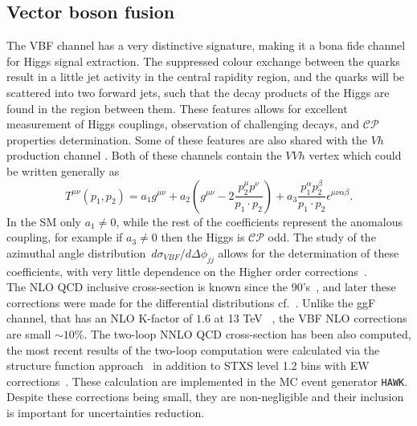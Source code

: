 \subsection{Vector boson fusion}
The VBF channel has a very distinctive signature, making it a bona fide channel for Higgs signal extraction. The suppressed colour exchange between the quarks result in a little jet activity in the central rapidity region, and the quarks will be scattered into two forward jets, such that the decay products of the Higgs are found in the region between them.  These features allows for excellent measurement of Higgs couplings, observation of challenging decays, and $\mathcal{CP}$ properties determination. Some of these features are also shared with the $Vh$ production channel . Both of these channels contain the $VVh$ vertex which could be written generally as~\cite{LHCHiggsCrossSectionWorkingGroup:2016ypw}
\begin{equation}
T^{\mu \nu}(p_1,p_2) = a_1 g^{\mu \nu}+ a_2  \left(g^{\mu \nu}- 2\frac{p^\mu_{2} p^\nu }{p_1 \cdot p_2} \right)  + a_3 \frac{p_1^\alpha p_2^ \beta}{p_1 \cdot p_2}\epsilon^{\mu \nu \alpha \beta}. 
\end{equation} 
In the SM only $a_1\neq0$, while the rest of the coefficients represent the anomalous coupling, for example if $a_3 \neq0$ then the Higgs is  $\mathcal{CP}$  odd. The study of the azimuthal angle distribution~$d \sigma_{VBF} / d \Delta \phi_{jj}$ allows for  the determination of these coefficients, with very little dependence on the Higher order corrections~\cite{hankele2006anomalous}.\\  The NLO QCD inclusive cross-section is known since the 90's~\cite{Han:1992hr}, and later these corrections were made for the differential distributions cf.~\cite{Figy:2003nv,Berger:2004pca}. Unlike the ggF channel, that has an NLO  K-factor of $1.6$ at 13 TeV~\cite{Gomez-Bock:2007azi} , the VBF NLO corrections are small $\sim 10\%$. The two-loop NNLO QCD cross-section has been also computed, the most recent results of the two-loop computation were calculated via the structure function approach~\cite{Bolzoni:2010xr} in addition to STXS level 1.2 bins with EW corrections~\cite{Denner:2014cla}. These calculation are implemented in the MC event generator  \texttt{HAWK}. Despite these corrections being small, they are non-negligible and their inclusion is important for uncertainties reduction.
